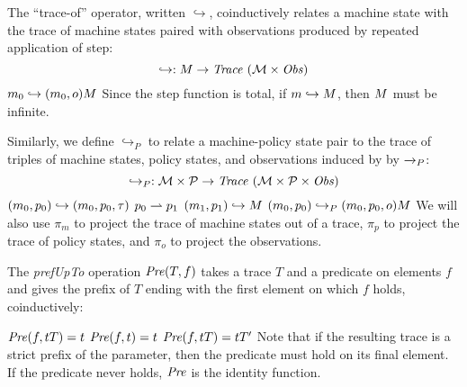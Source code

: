 \documentclass[acmsmall,review,anonymous]{acmart}\settopmatter{printfolios=true,printccs=false,printacmref=false}
\begin{document}
The ``trace-of'' operator, written \(\hookrightarrow\), coinductively
relates a machine state with the trace of machine states paired with
observations produced by repeated application of step:  
%
\[\hookrightarrow : M \rightarrow \mathit{Trace}~({\mathcal M} \times \mathit{Obs})\]%
%
            {\(m_0 \hookrightarrow (m_0,o) M\)}%
%
\noindent
Since the step function is total, if \(m \hookrightarrow M\),
then \(M\) must be infinite.


Similarly, we define \(\hookrightarrow_P\) to relate a machine-policy
state pair to the trace of triples of machine states, policy states,
and observations induced by by \(\xrightarrow{}_P\): 
%
\[\hookrightarrow_P : {\mathcal M} \times \mathcal{P} \rightarrow \mathit{Trace}~({\mathcal M} \times \mathcal{P} \times \mathit{Obs}) \]
%
         {\((m_0,p_0) \hookrightarrow (m_0,p_0,\tau)\)}
%
              {\(p_0 \rightharpoonup p_1\)}
              {\((m_1,p_1) \hookrightarrow M\)}
              {\((m_0,p_0) \hookrightarrow_P (m_0,p_0,o) M\)}
We will also use \(\pi_m\) to project the trace of machine states
out of a trace, \(\pi_p\) to project the trace of policy states, and
\(\pi_o\) to project the observations.  

The {\it prefUpTo} operation \(\mathit{Pre}(T,f)\) 
takes a trace \(T\) 
and a predicate on elements \(f\) and gives the prefix of \(T\)
ending with the first element on which \(f\) holds, coinductively:

         {\(\mathit{Pre}(f,tT) = t\)}
%
\judgment{}
         {\(\mathit{Pre}(f,t) = t\)}
%
            {\(\mathit{Pre}(f,tT) = tT'\)}
%
Note that if the resulting trace is a strict prefix of the parameter, then the
predicate must hold on its final element. If the predicate never holds,
\(\mathit{Pre}\) is the identity function.
\end{document}
